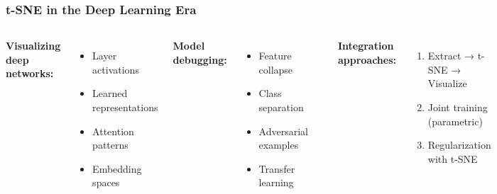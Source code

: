 \documentclass[aspectratio=169]{beamer}
\begin{document}
\begin{frame}
\frametitle{t-SNE in the Deep Learning Era}
\begin{columns}[T]
\textbf{Visualizing deep networks:}
\begin{itemize}
\small
\item Layer activations
\item Learned representations
\item Attention patterns
\item Embedding spaces
\end{itemize}

\vspace{0.3cm}
\textbf{Model debugging:}
\begin{itemize}
\small
\item Feature collapse
\item Class separation
\item Adversarial examples
\item Transfer learning
\end{itemize}

\begin{center}
\end{center}

\textbf{Integration approaches:}
\begin{enumerate}
\small
\item Extract → t-SNE → Visualize
\item Joint training (parametric)
\item Regularization with t-SNE
\end{enumerate}
\end{columns}
\end{frame}
\end{document}
